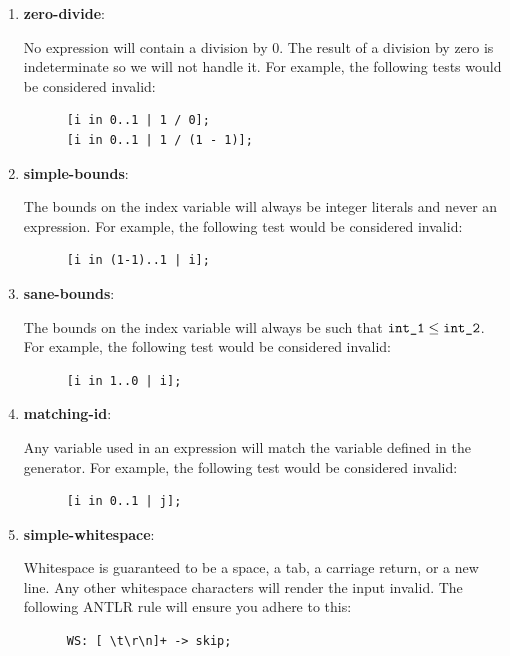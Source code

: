 \documentclass{article}
\newcommand{\code}[1]{\texttt{\textmd{#1}}}
\newcommand{\assertiondest}[1]{\hypertarget{#1}{\textbf{#1}:}}
\begin{document}
\begin{enumerate}
\begin{lstlisting}
    \end{lstlisting}
  \item
    \assertiondest{zero-divide}
    No expression will contain a division by 0. The result of a division by zero is indeterminate
    so we will not handle it. For example, the following tests would be considered invalid:
    \begin{lstlisting}
      [i in 0..1 | 1 / 0];
      [i in 0..1 | 1 / (1 - 1)];
    \end{lstlisting}
  \item
    \assertiondest{simple-bounds}
    The bounds on the index variable will always be integer literals and never an expression. For
    example, the following test would be considered invalid:
    \begin{lstlisting}
      [i in (1-1)..1 | i];
    \end{lstlisting}
  \item
    \assertiondest{sane-bounds}
    The bounds on the index variable will always be such that $\code{int\_1} \leq
    \code{int\_2}$. For example, the following test would be considered invalid:
    \begin{lstlisting}
      [i in 1..0 | i];
    \end{lstlisting}
  \item
    \assertiondest{matching-id}
    Any variable used in an expression will match the variable defined in the generator. For
    example, the following test would be considered invalid:
    \begin{lstlisting}
      [i in 0..1 | j];
    \end{lstlisting}
  \item
    \assertiondest{simple-whitespace}
    Whitespace is guaranteed to be a space, a tab, a carriage return, or a new
    line. Any other whitespace characters will render the input invalid. The following ANTLR rule
    will ensure you adhere to this:
    \begin{lstlisting}
      WS: [ \t\r\n]+ -> skip;
    \end{lstlisting}
\end{enumerate}
\end{document}
